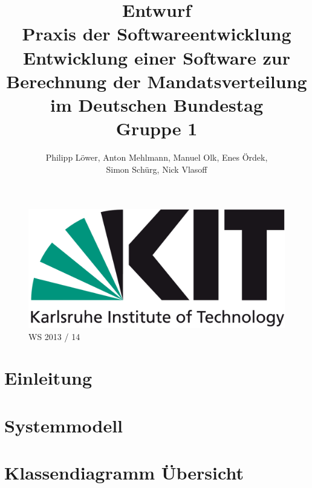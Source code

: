 \documentclass[10pt,a4paper]{article}
\title{\Huge Entwurf\\[1cm] {\bfseries Praxis der Softwareentwicklung}\\[2cm] Entwicklung einer Software zur Berechnung der Mandatsverteilung im Deutschen Bundestag\\[1cm]Gruppe 1}
\author{Philipp Löwer, Anton Mehlmann, Manuel Olk, Enes Ördek, \\Simon Schürg, Nick Vlasoff}
\date{}
\begin{document}
\maketitle
\thispagestyle{empty}

\begin{figure}[h]

\centering
		
		\includegraphics[scale=0.6]{KIT-Logo.png}\\
		\Huge WS 2013 / 14
\end{figure}

\newpage
\begin{onehalfspace}
\tableofcontents
\end{onehalfspace}
\newpage 

\section{Einleitung}



\section{Systemmodell}


\section{Klassendiagramm Übersicht}
\end{document}
